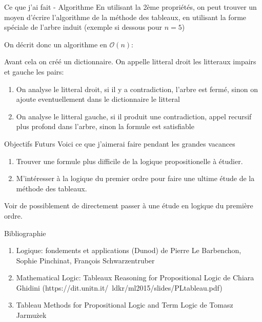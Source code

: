 \documentclass[]{beamer}
\begin{document}
\begin{frame}{Ce que j'ai fait - Algorithme}
    En utilisant la 2ème propriétés, on peut trouver un moyen d'écrire l'algorithme de la méthode des tableaux, en utilisant la forme spéciale de l'arbre induit (exemple si dessous pour $n=5$)
    \pause
    On décrit donc un algorithme en $\mathcal{O}(n)$:

    Avant cela on créé un dictionnaire. 
    On appelle litteral droit les litteraux impairs et gauche les pairs:  
    \begin{enumerate}
        \item On analyse le litteral droit, si il y a contradiction, l'arbre est fermé, sinon on ajoute eventuellement dans le dictionnaire le litteral
        \item On analyse le litteral gauche, si il produit une contradiction, appel recursif plus profond dans l'arbre, sinon la formule est satisfiable
    \end{enumerate}
\end{frame}

\begin{frame}{Objectifs Futurs}
    Voici ce que j'aimerai faire pendant les grandes vacances
    \begin{enumerate}
        \item Trouver une formule plus difficile de la logique propositionelle à étudier.
        \item M'intéresser à la logique du premier ordre pour faire une ultime étude de la méthode des tableaux.
    \end{enumerate}
    Voir de possiblement de directement passer à une étude en logique du première ordre.
\end{frame}

\begin{frame}{Bibliographie}
\begin{enumerate}
    \item Logique: fondements et applications (Dunod) de Pierre Le Barbenchon, Sophie Pinchinat, François Schwarzentruber
    \item Mathematical Logic: Tableaux Reasoning for Propositional Logic de Chiara Ghidini (https://dit.unitn.it/~ldkr/ml2015/slides/PLtableau.pdf)
    \item Tableau Methods for Propositional Logic and Term Logic de Tomasz Jarmużek
\end{enumerate}
\end{frame}
\end{document}

